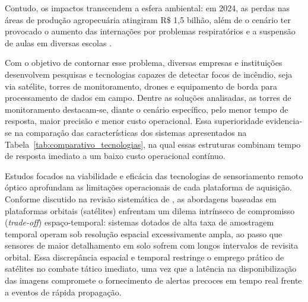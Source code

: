 Contudo, os impactos transcendem a esfera ambiental: em 2024, as perdas nas áreas de produção agropecuária atingiram R\$ 1,5 bilhão, além de o cenário ter provocado o aumento das internações por problemas respiratórios e a suspensão de aulas em diversas escolas \cite{versiane2025cerrado}.

Com o objetivo de contornar esse problema, diversas empresas e instituições desenvolvem pesquisas e tecnologias capazes de detectar focos de incêndio, seja via satélite, torres de monitoramento, drones e equipamento de borda para processamento de dados em campo. Dentre as soluções analisadas, as torres de monitoramento destacam-se, diante o cenário específico, pelo menor tempo de resposta, maior precisão e menor custo operacional. Essa superioridade evidencia-se na comparação das características dos sistemas apresentados na Tabela~\ref{tab:comparativo_tecnologias}, na qual essas estruturas combinam tempo de resposta imediato a um baixo custo operacional contínuo.

Estudos focados na viabilidade e eficácia das tecnologias de sensoriamento remoto óptico aprofundam as limitações operacionais de cada plataforma de aquisição. Conforme discutido na revisão sistemática de , as abordagens baseadas em plataformas orbitais (satélites) enfrentam um dilema intrínseco de compromisso (\textit{trade-off}) espaço-temporal: sistemas dotados de alta taxa de amostragem temporal operam sob resolução espacial excessivamente ampla, ao passo que sensores de maior detalhamento em solo sofrem com longos intervalos de revisita orbital. Essa discrepância espacial e temporal restringe o emprego prático de satélites no combate tático imediato, uma vez que a latência na disponibilização das imagens compromete o fornecimento de alertas precoces em tempo real frente a eventos de rápida propagação.


